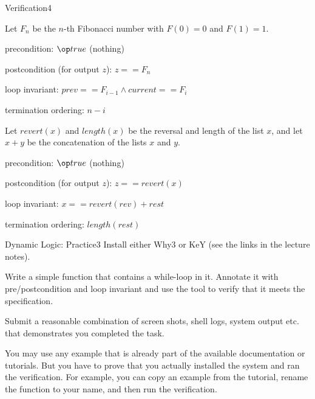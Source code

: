 \documentclass[a4paper]{article}
\begin{document}
\begin{problem}{Verification}{4}
\begin{solution}
Let $F_n$ be the $n$-th Fibonacci number with $F(0)=0$ and $F(1)=1$.
\begin{compactitem}
\item precondition: $\true$ (nothing)
\item postcondition (for output $z$): $z==F_n$
\item loop invariant: $prev==F_{i-1}\wedge current==F_i$
\item termination ordering: $n-i$
\end{compactitem}
\end{solution}

\begin{acode}
\end{acode}

\begin{solution}
Let $revert(x)$ and $length(x)$ be the reversal and length of the list $x$, and let $x+y$ be the concatenation of the lists $x$ and $y$.
\begin{compactitem}
\item precondition: $\true$ (nothing)
\item postcondition (for output $z$): $z==revert(x)$
\item loop invariant: $x==revert(rev)+rest$
\item termination ordering: $length(rest)$
\end{compactitem}
\end{solution}
\end{problem}


\begin{problem}{Dynamic Logic: Practice}{3}
Install either Why3 or KeY (see the links in the lecture notes).

Write a simple function that contains a while-loop in it.
Annotate it with pre/postcondition and loop invariant and use the tool to verify that it meets the specification.
\medskip

Submit a reasonable combination of screen shots, shell logs, system output etc. that demonstrates you completed the task.

You may use any example that is already part of the available documentation or tutorials.
But you have to prove that you actually installed the system and ran the verification.
For example, you can copy an example from the tutorial, rename the function to your name, and then run the verification.
\end{problem}
\end{document}
